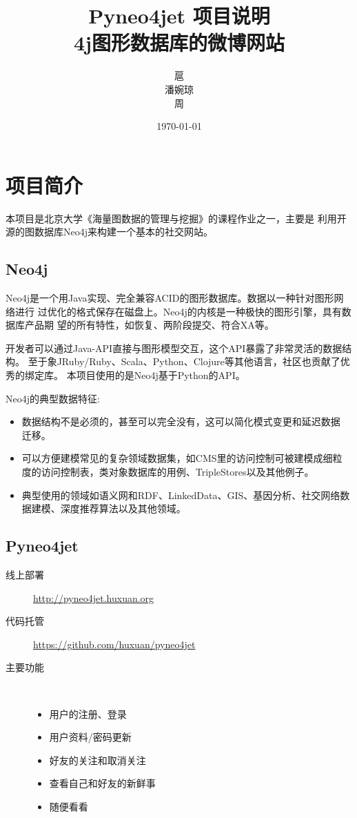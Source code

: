 \documentclass{yaldc}
\title{Pyneo4jet 项目说明\\[2ex]\large基于Neo4j图形数据库的微博网站}
\author{
    \normalsize 扈\quad煊\qquad 1201214133 \\
    \normalsize 潘婉琼\qquad 1201214139 \\
    \normalsize 周\quad志\qquad 1201214118
}
\date{\today}
\begin{document}
\maketitle

\tableofcontents

\section{项目简介}

本项目是北京大学《海量图数据的管理与挖掘》的课程作业之一，主要是
利用开源的图数据库Neo4j来构建一个基本的社交网站。

\subsection{Neo4j}
Neo4j是一个用Java实现、完全兼容ACID的图形数据库。数据以一种针对图形网络进行
过优化的格式保存在磁盘上。Neo4j的内核是一种极快的图形引擎，具有数据库产品期
望的所有特性，如恢复、两阶段提交、符合XA等。

开发者可以通过Java-API直接与图形模型交互，这个API暴露了非常灵活的数据结构。
至于象JRuby/Ruby、Scala、Python、Clojure等其他语言，社区也贡献了优秀的绑定库。
本项目使用的是Neo4j基于Python的API。

Neo4j的典型数据特征:
\begin{itemize}
    \item 数据结构不是必须的，甚至可以完全没有，这可以简化模式变更和延迟数据
        迁移。
    \item 可以方便建模常见的复杂领域数据集，如CMS里的访问控制可被建模成细粒
        度的访问控制表，类对象数据库的用例、TripleStores以及其他例子。
    \item 典型使用的领域如语义网和RDF、LinkedData、GIS、基因分析、社交网络数
        据建模、深度推荐算法以及其他领域。
\end{itemize}

\subsection{Pyneo4jet}

\begin{description}
    \item[线上部署] \url{http://pyneo4jet.huxuan.org}
    \item[代码托管] \url{https://github.com/huxuan/pyneo4jet}
    \item[主要功能] ~
        \begin{itemize}
            \item 用户的注册、登录
            \item 用户资料/密码更新
            \item 好友的关注和取消关注
            \item 查看自己和好友的新鲜事
            \item 随便看看
        \end{itemize}
\end{description}
\end{document}
